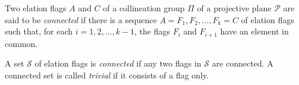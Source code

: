 Two elation flags $A$ and $C$ of a collineation group $\Pi$ of a projective plane $\mathcal{P}$ are said to be \textit{connected} if there is a sequence $A = F_1, F_2, \dots, F_k = C$ of elation flags such that, for each $i = 1, 2, \dots, k-1$, the flags $F_i$ and $F_{i+1}$ have an element in common.

A set $\mathcal{S}$ of elation flags is \textit{connected} if any two flags in $\mathcal{S}$ are connected. A connected set is called \textit{trivial} if it consists of a flag only.
